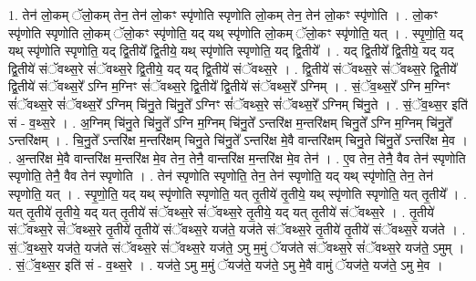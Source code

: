 \documentclass[17pt]{extarticle}
\begin{document}
1. तेन॑ लो॒कम् ॅलो॒कम् तेन॒ तेन॑ लो॒कꣳ स्पृ॑णोति स्पृणोति लो॒कम् तेन॒ तेन॑ लो॒कꣳ स्पृ॑णोति । . लो॒कꣳ स्पृ॑णोति स्पृणोति लो॒कम् ॅलो॒कꣳ स्पृ॑णोति॒ यद् यथ् स्पृ॑णोति लो॒कम् ॅलो॒कꣳ स्पृ॑णोति॒ यत् । . स्पृ॒णो॒ति॒ यद् यथ् स्पृ॑णोति स्पृणोति॒ यद् द्वि॒तीये᳚ द्वि॒तीये॒ यथ् स्पृ॑णोति स्पृणोति॒ यद् द्वि॒तीये᳚ । . यद् द्वि॒तीये᳚ द्वि॒तीये॒ यद् यद् द्वि॒तीये॑ संॅवथ्स॒रे सं॑ॅवथ्स॒रे द्वि॒तीये॒ यद् यद् द्वि॒तीये॑ संॅवथ्स॒रे । . द्वि॒तीये॑ संॅवथ्स॒रे सं॑ॅवथ्स॒रे द्वि॒तीये᳚ द्वि॒तीये॑ संॅवथ्स॒रे᳚ ऽग्नि म॒ग्निꣳ सं॑ॅवथ्स॒रे द्वि॒तीये᳚ द्वि॒तीये॑ संॅवथ्स॒रे᳚ ऽग्निम् । . सं॒ॅव॒थ्स॒रे᳚ ऽग्नि म॒ग्निꣳ सं॑ॅवथ्स॒रे सं॑ॅवथ्स॒रे᳚ ऽग्निम् चि॑नु॒ते चि॑नु॒ते᳚ ऽग्निꣳ सं॑ॅवथ्स॒रे सं॑ॅवथ्स॒रे᳚ ऽग्निम् चि॑नु॒ते । . सं॒ॅव॒थ्स॒र इति॑ सं - व॒थ्स॒रे । . अ॒ग्निम् चि॑नु॒ते चि॑नु॒ते᳚ ऽग्नि म॒ग्निम् चि॑नु॒ते᳚ ऽन्तरि॑क्ष म॒न्तरि॑क्षम् चिनु॒ते᳚ ऽग्नि म॒ग्निम् चि॑नु॒ते᳚ ऽन्तरि॑क्षम् । . चि॒नु॒ते᳚ ऽन्तरि॑क्ष म॒न्तरि॑क्षम् चिनु॒ते चि॑नु॒ते᳚ ऽन्तरि॑क्ष मे॒वै वान्तरि॑क्षम् चिनु॒ते चि॑नु॒ते᳚ ऽन्तरि॑क्ष मे॒व । . अ॒न्तरि॑क्ष मे॒वै वान्तरि॑क्ष म॒न्तरि॑क्ष मे॒व तेन॒ तेनै॒ वान्तरि॑क्ष म॒न्तरि॑क्ष मे॒व तेन॑ । . ए॒व तेन॒ तेनै॒ वैव तेन॑ स्पृणोति स्पृणोति॒ तेनै॒ वैव तेन॑ स्पृणोति । . तेन॑ स्पृणोति स्पृणोति॒ तेन॒ तेन॑ स्पृणोति॒ यद् यथ् स्पृ॑णोति॒ तेन॒ तेन॑ स्पृणोति॒ यत् । . स्पृ॒णो॒ति॒ यद् यथ् स्पृ॑णोति स्पृणोति॒ यत् तृ॒तीये॑ तृ॒तीये॒ यथ् स्पृ॑णोति स्पृणोति॒ यत् तृ॒तीये᳚ । . यत् तृ॒तीये॑ तृ॒तीये॒ यद् यत् तृ॒तीये॑ संॅवथ्स॒रे सं॑ॅवथ्स॒रे तृ॒तीये॒ यद् यत् तृ॒तीये॑ संॅवथ्स॒रे । . तृ॒तीये॑ संॅवथ्स॒रे सं॑ॅवथ्स॒रे तृ॒तीये॑ तृ॒तीये॑ संॅवथ्स॒रे यज॑ते॒ यज॑ते संॅवथ्स॒रे तृ॒तीये॑ तृ॒तीये॑ संॅवथ्स॒रे यज॑ते । . सं॒ॅव॒थ्स॒रे यज॑ते॒ यज॑ते संॅवथ्स॒रे सं॑ॅवथ्स॒रे यज॑ते॒ ऽमु म॒मुं ॅयज॑ते संॅवथ्स॒रे सं॑ॅवथ्स॒रे यज॑ते॒ ऽमुम् । . सं॒ॅव॒थ्स॒र इति॑ सं - व॒थ्स॒रे । . यज॑ते॒ ऽमु म॒मुं ॅयज॑ते॒ यज॑ते॒ ऽमु मे॒वै वामुं ॅयज॑ते॒ यज॑ते॒ ऽमु मे॒व । \newline
\end{document}
